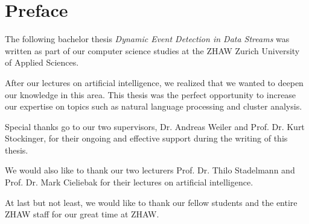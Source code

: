 \section*{Preface}
\label{sec:0_preface}

The following bachelor thesis \textit{Dynamic Event Detection in Data Streams} was written
as part of our computer science studies at the ZHAW Zurich University of Applied Sciences.

After our lectures on artificial intelligence, we realized that we wanted to deepen our knowledge in this area.
This thesis was the perfect opportunity to increase our expertise on topics such as natural language processing
and cluster analysis.

Special thanks go to our two supervisors, Dr. Andreas Weiler and Prof. Dr. Kurt Stockinger,
for their ongoing and effective support during the writing of this thesis.

We would also like to thank our two lecturers Prof. Dr. Thilo Stadelmann
and Prof. Dr. Mark Cieliebak for their lectures on artificial intelligence.

At last but not least, we would like to thank our fellow students
and the entire ZHAW staff for our great time at ZHAW.
